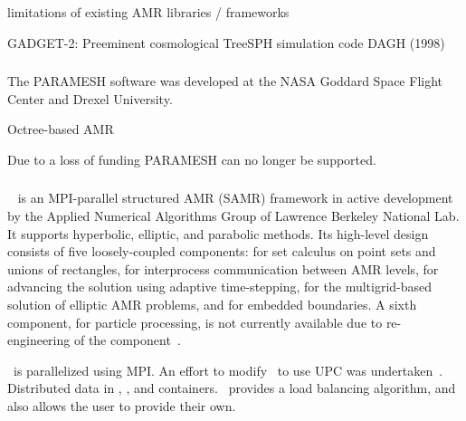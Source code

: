\documentclass{article}
\begin{document}
limitations of existing AMR libraries / frameworks

GADGET-2: Preeminent cosmological TreeSPH simulation code
DAGH (1998)

\subsubsection{} \label{sss:paramesh}

\nocite{wwwparamesh}
\nocite{MaOl00} %
\nocite{OlMa05}
\nocite{Ol06}

The PARAMESH software was developed at the NASA Goddard Space Flight
Center and Drexel University.

Octree-based AMR


Due to a loss of funding PARAMESH can no longer be supported.

\subsubsection{\chombo} \label{sss:chombo}



\chombo~\nocite{CoGr09} is an MPI-parallel structured AMR (SAMR)
framework in active development by the Applied Numerical Algorithms
Group of Lawrence Berkeley National Lab.  It supports hyperbolic,
elliptic, and parabolic methods. Its high-level design consists of
five loosely-coupled components:  for set calculus on
point sets and unions of rectangles,  for interprocess
communication between AMR levels,  for
advancing the solution using adaptive time-stepping,
 for the multigrid-based solution of elliptic AMR
problems, and  for embedded boundaries.  A sixth
component,  for particle processing, is not
currently available due to re-engineering of the
component~\cite{wwwchombo}.

\chombo\ is parallelized using MPI.  An effort to modify \chombo\ to
use UPC was undertaken~\cite{We04}.
Distributed data in , , and
 containers.  \chombo\ provides a load balancing
algorithm, and also allows the user to provide their own.
\end{document}

